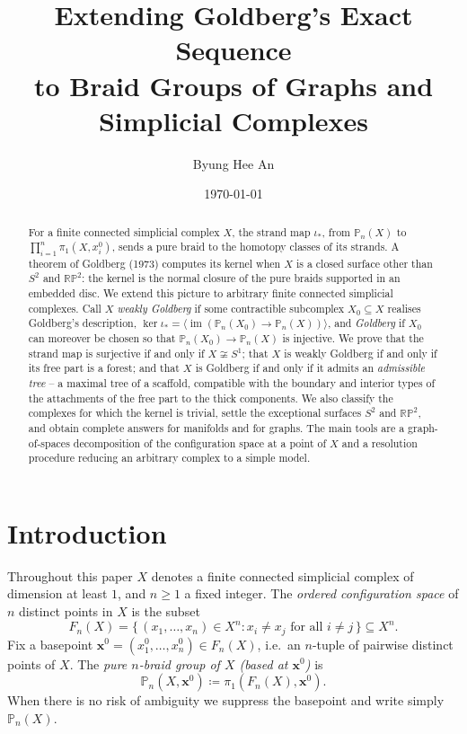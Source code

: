 \documentclass[reqno]{amsart}
\title[Extending Goldberg's Exact Sequence]{Extending Goldberg's Exact Sequence \\
to Braid Groups of Graphs and Simplicial Complexes}
\author{Byung Hee An}
\date{\today}
\theoremstyle{definition}
\newcommand\bfx{\mathbf{x}}
\newcommand{\PB}{\mathbb{P}}
\newcommand{\im}{\operatorname{im}}
\newcommand{\RP}{\mathbb{RP}}
\newcommand{\co}[1]{\mathopen{\langle}#1\mathclose{\rangle}} %
\newcommand{\base}{\bfx^0}
\numberwithin{equation}{section}
\begin{document}
\begin{abstract}
\noindent For a finite connected simplicial complex \(X\), the
strand map \(\iota_\ast\), from \(\PB_n(X)\) to
\(\prod_{i=1}^n\pi_1(X,x_i^0)\), sends a pure braid to the
homotopy classes of its strands. A
theorem of Goldberg (1973) computes its kernel when \(X\) is a
closed surface other than \(S^2\) and \(\RP^2\): the kernel is
the normal closure of the pure braids supported in an embedded
disc. We extend this picture to arbitrary finite connected
simplicial complexes. Call \(X\) \emph{weakly Goldberg} if some
contractible subcomplex \(X_0\subseteq X\) realises Goldberg's
description,
\(\ker\iota_\ast=\co{\im(\PB_n(X_0)\to\PB_n(X))}\), and
\emph{Goldberg} if \(X_0\) can moreover be chosen so that
\(\PB_n(X_0)\to\PB_n(X)\) is injective. We prove that the
strand map is surjective if and only if \(X\not\cong S^1\);
that \(X\) is weakly Goldberg if and only if its free part is a
forest; and that \(X\) is Goldberg if and only if it admits an
\emph{admissible tree} -- a maximal tree of a scaffold,
compatible with the boundary and interior types of the
attachments of the free part to the thick components. We also
classify the complexes for which the kernel is trivial, settle
the exceptional surfaces \(S^2\) and \(\RP^2\), and obtain
complete answers for manifolds and for graphs. The main tools
are a graph-of-spaces decomposition of the configuration space
at a point of \(X\) and a resolution procedure reducing an
arbitrary complex to a simple model.
\end{abstract}

\maketitle

\tableofcontents


\section{Introduction}

Throughout this paper \(X\) denotes a finite connected simplicial
complex of dimension at least \(1\), and \(n\geq 1\) a fixed integer.
The \emph{ordered configuration space} of \(n\) distinct points in
\(X\) is the subset
\[
F_n (X) = \{\,(x_1,\dots,x_n)\in X^n : x_i\neq x_j
\text{ for all } i\neq j\,\} \subseteq X^n.
\]
Fix a basepoint
\(\base = (x_1^0,\dots,x_n^0)\in F_n (X)\), i.e.\ an \(n\)-tuple of
pairwise distinct points of \(X\). The \emph{pure \(n\)-braid group
of \(X\) (based at \(\base\))} is
\[
\PB_n(X,\base) \coloneqq \pi_1(F_n (X), \base).
\]
When there is no risk of ambiguity we suppress the basepoint and
write simply \(\PB_n(X)\).
\end{document}
